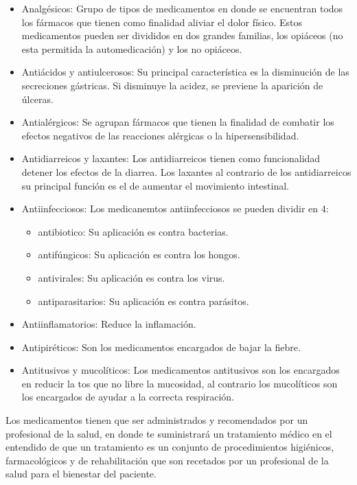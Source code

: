 \begin{itemize}
	\item Analgésicos: Grupo de tipos de medicamentos en donde se encuentran todos los fármacos que tienen como finalidad aliviar el dolor físico. Estos medicamentos pueden ser divididos en dos grandes familias, los opiáceos (no esta permitida la automedicación) y los no opiáceos.
		
	\item Antiácidos y antiulcerosos: Su principal característica es la disminución de las secreciones gástricas. Si disminuye la acidez, se previene la aparición de úlceras.
	
	\item Antialérgicos: Se agrupan fármacos que tienen la finalidad de combatir los efectos negativos de las reacciones alérgicas o la hipersensibilidad.
	
	\item Antidiarreicos y laxantes: Los antidiarreicos tienen como funcionalidad detener los efectos de la diarrea. Los laxantes al contrario de los antidiarreicos su principal función es el de aumentar el movimiento intestinal.
	
	\item Antiinfecciosos: Los medicanemtos antiinfecciosos se pueden dividir en 4:
		\begin{itemize}
			\item antibiotico: Su aplicación es contra bacterias.
			\item antifúngicos: Su aplicación es contra los hongos.
			\item antivirales: Su aplicación es contra los virus.
			\item antiparasitarios: Su aplicación es contra parásitos.
		\end{itemize}
	
	\item Antiinflamatorios: Reduce la inflamación.
	
	\item Antipiréticos: Son los medicamentos encargados de bajar la fiebre.
	
	\item Antitusivos y mucolíticos: Los medicamentos antitusivos son los encargados en reducir la tos que no libre la mucosidad, al contrario los mucolíticos son los encargados de ayudar a la correcta respiración.
	 
\end{itemize}
Los medicamentos tienen que ser administrados y recomendados por un profesional de la salud, en donde te suministrará un tratamiento médico en el entendido de que un tratamiento es un conjunto de procedimientos higiénicos, farmacológicos y de rehabilitación que son recetados por un profesional de la salud para el bienestar del paciente. 

